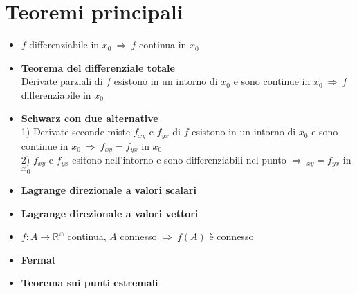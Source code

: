 \documentclass[a4paper,portrait,columns=3,5pt]{cheatsheet}
\begin{document}
\section{Teoremi principali}
\begin{itemize}
	\item $f$ differenziabile in $x_0~ \Rightarrow~f$ continua in $x_0 $
	\item \textbf{Teorema del differenziale totale} \\ Derivate parziali di $f$ esistono in un intorno di $x_0$ e sono continue in $x_0~\Rightarrow ~ f$ differenziabile in $x_0$ 
	\item \textbf{Schwarz con due alternative} \\ 1) Derivate seconde miste $f_{xy}$ e $f_{yx}$ di $f$ esistono in un intorno di $x_0$ e sono continue in $x_0~\Rightarrow~f_{xy} = f_{yx}$ in $x_0$
			\\ 2) $f_{xy}$ e $f_{yx}$ esitono nell'intorno e sono differenziabili nel punto $\Rightarrow~_{xy} = f_{yx}$ in $x_0$
	\item \textbf{Lagrange direzionale a valori scalari} 
	\item \textbf{Lagrange direzionale a valori vettori}
	\item $f : A \rightarrow \mathbb{R^m}$ continua, $A$ connesso $\Rightarrow~f(A)$ è connesso
	\item \textbf{Fermat}
	\item \textbf{Teorema sui punti estremali}


\end{itemize}
\end{document}
